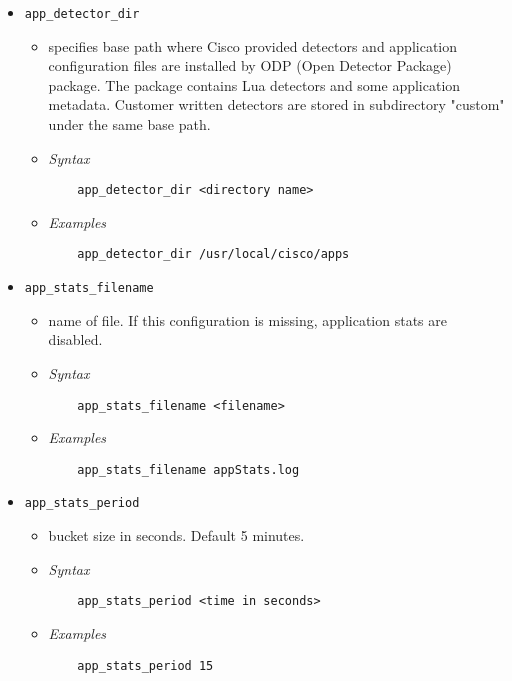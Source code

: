 \documentclass[english]{report}
\begin{document}
\begin{itemize}
\item[] \texttt{app\_detector\_dir}
\begin{itemize}
\item[]
      specifies base path where Cisco provided detectors and application
      configuration files are installed by ODP (Open Detector Package) package.
      The package contains Lua detectors and some application metadata. Customer
      written detectors are stored in subdirectory "custom" under the same base path.
\item[] \textit{Syntax}
\begin{verbatim}
    app_detector_dir <directory name>
\end{verbatim}
\item[] \textit{Examples}
\begin{verbatim}
    app_detector_dir /usr/local/cisco/apps
\end{verbatim}
\end{itemize}

\item[] \texttt{app\_stats\_filename}
\begin{itemize}
\item[]  name of file. If this configuration is missing, application stats are disabled.
\item[] \textit{Syntax}
\begin{verbatim}
    app_stats_filename <filename>
\end{verbatim}
\item[] \textit{Examples}
\begin{verbatim}
    app_stats_filename appStats.log
\end{verbatim}
\end{itemize}

\item[] \texttt{app\_stats\_period}
\begin{itemize}
\item[]
      bucket size in seconds. Default 5 minutes.
\item[] \textit{Syntax}
\begin{verbatim}
    app_stats_period <time in seconds>
\end{verbatim}
\item[] \textit{Examples}
\begin{verbatim}
    app_stats_period 15
\end{verbatim}
\end{itemize}


\end{itemize}
\end{document}
